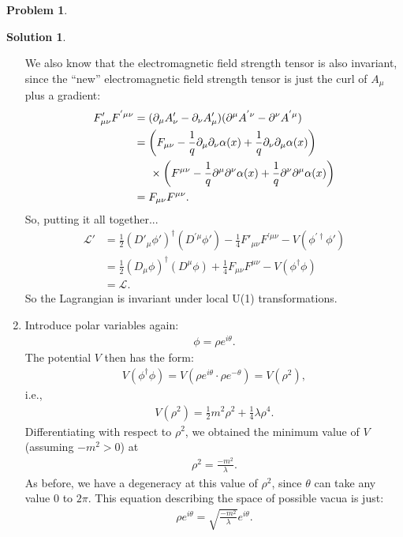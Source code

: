 \documentclass[a4paper,11pt]{article}
\numberwithin{equation}{section}
\theoremstyle{definition}
\newtheorem{prob}{Problem}[section]
\newtheorem{sln}{Solution}[section]
\newcommand{\p}{\partial}
\newcommand{\lag}{\mathcal{L}}
\begin{document}
\begin{prob}
\begin{sln}
\begin{enumerate}
				We also know that the electromagnetic field strength tensor is also invariant, since the ``new'' electromagnetic field strength tensor is just the curl of $A_\mu$ plus a gradient:
				\begin{align}
				F'_{\mu\nu}F^{'\mu\nu} &= (\p_\mu A'_\nu - \p_\nu A'_\mu)(\p^\mu A^{'\nu} - \p^\nu A^{'\mu} )\nonumber\\
				&= \left(F_{\mu\nu} - \frac{1}{q}\p_\mu\p_\nu \alpha(x) + \frac{1}{q}\p_\nu\p_\mu \alpha(x)\right)\nonumber\\
				&\hspace{0.5cm}\times\left( F^{\mu\nu} - \frac{1}{q}\p^\mu\p^\nu \alpha(x) + \frac{1}{q}\p^\nu\p^\mu \alpha(x) \right)\nonumber\\
				&=F_{\mu\nu}F^{\mu\nu}.
				\end{align}
				So, putting it all together...
				\begin{align}
				\lag' &= \frac{1}{2}(D'_\mu\phi')^\dagger(D^{'\mu}\phi') - \frac{1}{4}F'_{\mu\nu}F^{'\mu\nu} - V(\phi^{'\dagger}\phi')\nonumber\\
				&= \frac{1}{2}(D_\mu\phi)^\dagger(D^\mu\phi) + \frac{1}{4}F_{\mu\nu}F^{\mu\nu} - V(\phi^\dagger\phi)\nonumber\\
				&= \lag.
				\end{align}
				So the Lagrangian is invariant under local U(1) transformations.\\
				
				
				
				
				
				\item Introduce polar variables again:
				\begin{align}
				\phi = \rho e^{i\theta}.
				\end{align}
				The potential $V$ then has the form:
				\begin{align}
				V(\phi^\dagger\phi) = V(\rho e^{i\theta} \cdot \rho e^{-\theta}) = V(\rho^2),
				\end{align}
				i.e.,
				\begin{align}
				V(\rho^2) = \frac{1}{2}m^2\rho^2 + \frac{1}{4}\lambda \rho^4.
				\end{align}
				Differentiating with respect to $\rho^2$, we obtained the minimum value of $V$ (assuming $- m^2 > 0$) at
				\begin{align}
				\rho^2 = \frac{-m^2}{\lambda}.
				\end{align}
				As before, we have a degeneracy at this value of $\rho^2$, since $\theta$ can take any value $0$ to $2\pi$. This equation describing the space of possible vacua is just:
				\begin{align}
				\rho e^{i\theta} = \sqrt{\frac{-m^2}{\lambda}}e^{i\theta}.
				\end{align}
				

\end{enumerate}
\end{sln}
\end{prob}
\end{document}
